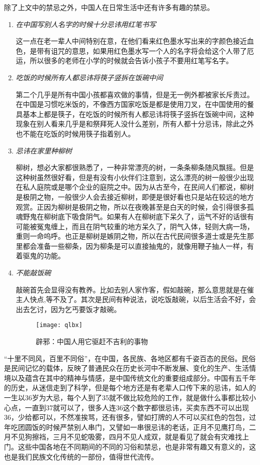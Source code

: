     除了上文中的禁忌之外，中国人在日常生活中还有许多有趣的禁忌。
    \begin{enumerate}
    \item
    \emph{在中国写别人名字的时候十分忌讳用红笔书写}

   这一点在老一辈人中间特别在意，在他们看来红色墨水写出来的字颜色接近血色，是带有诅咒的意思，如果用红色墨水写一个人的名字将会给这个人带了厄运，所以很多的老师在小学的时候就会告诉小孩子不要用红笔写名字。

   \item
   \emph{吃饭的时候所有人都忌讳将筷子竖拆在饭碗中间}

   第二个几乎是所有中国小孩都喜欢做的事情，但是无一例外都被家长斥责过。在中国是习惯吃米饭的，不像西方国家吃饭是都是使用刀叉，在中国使用的餐具基本上都是筷子，在吃饭的时候所有人都忌讳将筷子竖拆在饭碗中间，这种现象在别人看来几乎是和祭拜死人没什么差别，所有人都十分忌讳，除此之外也不能在吃饭的时候用筷子指着别人。

   \item
   \emph{忌讳在家里种柳树}

   柳树，想必大家都很熟悉了，一种非常漂亮的树，一条条柳条随风飘摇。但是这种树虽然很好看，但是有没有小伙伴们注意到，这么漂亮的树一般很少出现在私人庭院或是哪个企业的庭院之中。因为从古至今，在民间人们都说，柳树是极阴之物，一般很少人会去接近柳树，即便是很好看也只是站在较远的地方观赏。正因为柳树是极阴之物，所以在夜晚甚至是白天的时候，会引得很多孤魂野鬼在柳树底下吸食阴气。如果有人在柳树底下呆久了，运气不好的话很有可能被冤鬼缠上，而且在阴气较重的地方呆久了，阴气入体，轻则大病一场，重则一命呜呼。也正是柳树是嫉阴之物，所以在古代民间很多道士或是先生那里都会准备一些柳条，因为柳条是可以直接抽鬼的，就像用鞭子抽人一样，有着驱鬼的功能。

   \item
   \emph{不能敲饭碗}

   敲碗首先会显得没有教养。比如去别人家作客，假如敲碗，那么意思就是在催主人快点,等不及了。其次是民间有种说法，说吃饭敲碗，以后生活会不好，会出去乞讨，因为乞丐要饭才敲碗。
        
   \begin{figure}[htb]
    \centering
    \texttt{[image: qlbx]}
    \caption{辟邪：中国人用它驱赶不吉利的事物}
    
    \end{figure}

    \end{enumerate}



   “十里不同风，百里不同俗”，在中国，各民族、各地区都有千姿百态的民俗。民俗是民间记忆的载体，反映了普通民众在历史长河中不断发展、变化的生产、生活情境以及蕴含在其中的精神与情感，是中国传统文化的重要组成部分。中国有五千年的历史，从迷信走到了科学，但是每个地方还是有老辈人口传下来的忌讳，如人的一生以36岁为大忌，每个人到了35就不做比较危险的工作，就是做什么事都比较小心点，一直到37就可以了，很多人连36这个数字都很忌讳，买卖东西不可以出现36，少给都可以，不然准挨骂，还有很多，譬如打牌的人不可以买红色的包包，过年吃团圆饭的时候严禁别人串门，又譬如一串很忌讳的老话，正月不见鹰打鸟，二月不见狗擦裆，三月不见蛇吸雾，四月不见人成双，就是看见了就会有灾难找上门。这些中国各地在不同期间的不同的习俗和禁忌，也是非常有趣又有意义的，这也是我们民族文化传统的一部份，值得世代流传。
